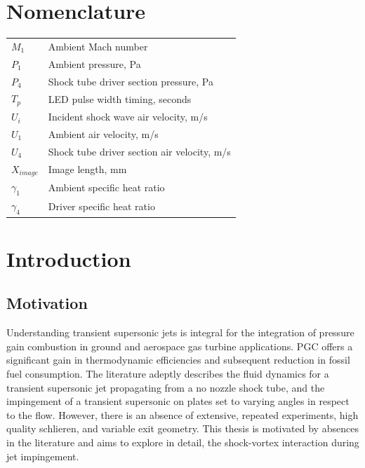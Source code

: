 \section*{Nomenclature}
\begin{table}[H]
\begin{tabular}{ll} \smallskip
$M_1$      & Ambient Mach number                         \\ \smallskip
$P_1$      & Ambient pressure, Pa                        \\ \smallskip
$P_4$      & Shock tube driver section pressure, Pa      \\ \smallskip
$T_p$      & LED pulse width timing, seconds             \\ \smallskip
$U_i$      & Incident shock wave air velocity, m/s       \\ \smallskip
$U_1$      & Ambient air velocity, m/s                   \\ \smallskip
$U_4$      & Shock tube driver section air velocity, m/s \\ \smallskip
$X_{image}$      & Image length, mm                      \\ \smallskip
$\gamma_1$ & Ambient specific heat ratio                 \\ \smallskip
$\gamma_4$ & Driver specific heat ratio                 
\end{tabular}
\end{table}
 


\newpage
{}
\section{Introduction} 

\subsection{Motivation}
Understanding transient supersonic jets is integral for the integration of pressure gain combustion in ground and aerospace gas turbine applications. PGC offers a significant gain in thermodynamic efficiencies and subsequent reduction in fossil fuel consumption. The literature adeptly describes the fluid dynamics for a transient supersonic jet propagating from a no nozzle shock tube, and the impingement of a transient supersonic on plates set to varying angles in respect to the flow. However, there is an absence of extensive, repeated experiments, high quality schlieren, and variable exit geometry. This thesis is motivated by absences in the literature and aims to explore in detail, the shock-vortex interaction during jet impingement.

